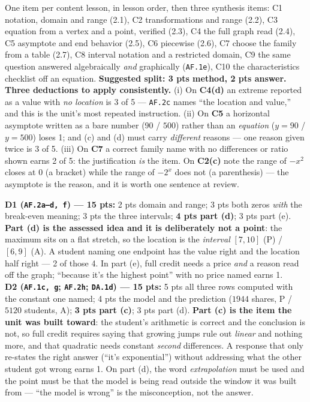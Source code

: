 \documentclass[10pt]{article}
\begin{document}
\boxguard[10]
\begin{teachernote}
\footnotesize
One item per content lesson, in lesson order, then three synthesis items: C1 notation, domain and
range (2.1), C2 transformations and range (2.2), C3 equation from a vertex and a point, verified
(2.3), C4 the full graph read (2.4), C5 asymptote and end behavior (2.5), C6 piecewise (2.6),
C7 choose the family from a table (2.7), C8 interval notation and a restricted domain, C9 the same
question answered algebraically \emph{and} graphically (\texttt{AF.1e}), C10 the characteristics
checklist off an equation. \textbf{Suggested split: 3 pts method, 2 pts answer.}\\[2pt]
\textbf{Three deductions to apply consistently.} (i) On \textbf{C4(d)} an extreme reported as a value
with \emph{no location} is 3 of 5 --- \texttt{AF.2c} names ``the location and value,'' and this is the
unit's most repeated instruction. (ii) On \textbf{C5} a horizontal asymptote written as a bare number
($90$ / $500$) rather than an \emph{equation} ($y=90$ / $y=500$) loses 1; and (c) and (d) must carry
\emph{different} reasons --- one reason given twice is 3 of 5. (iii) On \textbf{C7} a correct family
name with no differences or ratio shown earns 2 of 5: the justification \emph{is} the item.
On \textbf{C2(c)} note the range of $-x^2$ closes at $0$ (a bracket) while the range of $-2^x$ does
not (a parenthesis) --- the asymptote is the reason, and it is worth one sentence at review.
\end{teachernote}

\boxguard[10]
\begin{teachernote}
\footnotesize
\textbf{D1 (\texttt{AF.2a--d, f}) --- 15 pts:} 2 pts domain and range; 3 pts both zeros \emph{with}
the break-even meaning; 3 pts the three intervals; \textbf{4 pts part (d)}; 3 pts part (e).
\textbf{Part (d) is the assessed idea and it is deliberately not a point}: the maximum sits on a flat
stretch, so the location is the \emph{interval} $[7,10]$ (P) / $[6,9]$ (A). A student naming one
endpoint has the value right and the location half right --- 2 of those 4. In part (e), full credit
needs a price \emph{and} a reason read off the graph; ``because it's the highest point'' with no
price named earns 1.\\[2pt]
\textbf{D2 (\texttt{AF.1c, g}; \texttt{AF.2h}; \texttt{DA.1d}) --- 15 pts:} 5 pts all three rows
computed with the constant one named; 4 pts the model and the prediction ($1944$ shares, P /
$5120$ students, A); \textbf{3 pts part (c)}; 3 pts part (d). \textbf{Part (c) is the item the unit
was built toward}: the student's arithmetic is correct and the conclusion is not, so full credit
requires saying that growing jumps rule out \emph{linear} and nothing more, and that quadratic needs
constant \emph{second} differences. A response that only re-states the right answer (``it's
exponential'') without addressing what the other student got wrong earns 1. On part (d), the word
\emph{extrapolation} must be used and the point must be that the model is being read outside the
window it was built from --- ``the model is wrong'' is the misconception, not the answer.
\end{teachernote}
\end{document}

